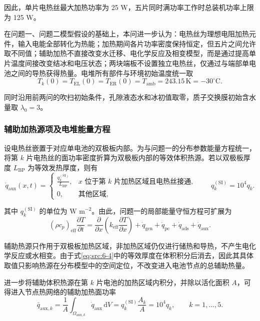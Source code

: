 \documentclass[bwprint]{gmcmthesis}
\numberwithin{equation}{section}
\numberwithin{figure}{section}
\begin{document}
 因此，单片电热丝最大加热功率为 25 W，五片同时满功率工作时总装机功率上限为 125 W。

 在问题一、问题二模型假设的基础上，本问进一步认为：电热丝为理想电阻加热元件，输入电能全部转化为热能；加热期间各片功率密度保持恒定，但五片之间允许取不同值；辅助加热不直接改变水迁移、电化学反应及相变模型，而是通过提高单片温度间接改变结冰和电压状态；两块端板不设置独立电热丝，仅通过与端部单电池之间的导热获得热量。电堆所有部件与环境初始温度统一取
\begin{equation}
T_k(0) = T_{\text{EL}}(0) = T_{\text{ER}}(0) = T_{\text{amb}} = 243.15 \, \text{K} = -30^\circ\text{C}. \label{eq:src:6-3}
\end{equation}

 同时沿用前两问的吹扫初始条件，孔隙液态水和冰初值取零，质子交换膜初始含水量取 \(\lambda_0 = 3\)。

\subsubsection{辅助加热源项及电堆能量方程}

 设电热丝嵌置于对应单电池的双极板内部。为与问题一的分布参数能量方程统一，将第 \(k\) 片电热丝的面功率密度折算为双极板内部的等效体积热源。若以双极板厚度 \(L_{\text{BP}}\) 为等效发热厚度，则有
\begin{equation}
\dot{q}_{\text{aux}}(x,t) = \begin{cases}
\frac{q_k^{(\text{SI})}}{L_{\text{BP}}}, & x \text{ 位于第 } k \text{ 片加热区域且电热丝接通}, \\
0, & \text{其他区域},
\end{cases} \qquad q_k^{(\text{SI})} = 10^4 q_k. \label{eq:src:6-4}
\end{equation}

 其中 \(q_k^{(\text{SI})}\) 的单位为 \(\text{W m}^{-2}\)。由此，问题一的局部能量守恒方程可扩展为
\begin{equation}
(\rho c_p)_{\text{eff}} \frac{\partial T}{\partial t} = \frac{\partial}{\partial x} \left( k_{\text{eff}} \frac{\partial T}{\partial x} \right) + \dot{q}_{\text{gen}} + \dot{q}_{\text{pc}} + \dot{q}_{\text{ads}} + \dot{q}_{\text{aux}}. \label{eq:src:6-5}
\end{equation}

 辅助热源只作用于双极板加热区域，非加热区域仍仅进行储热和导热，不产生电化学反应或水相变。由于式\eqref{eq:src:6-4}中的等效厚度在体积积分后消去，因此其具体取值只影响热源在分布模型中的空间定位，不改变进入电池节点的总辅助热量。

 进一步将辅助体积热源在第 \(k\) 片电池的加热区域内积分，并除以活化面积 \(A\)，可得进入节点热网络的辅助加热面功率
\begin{equation}
\bar{q}_{\text{aux},k} = \frac{1}{A} \int_{\Omega_{\text{aux},k}} \dot{q}_{\text{aux}} \, \mathrm{d}V = q_k^{(\text{SI})} \frac{A_k}{A} = 10^4 q_k, \qquad k = 1, \dots, 5. \label{eq:src:6-6}
\end{equation}
\end{document}
